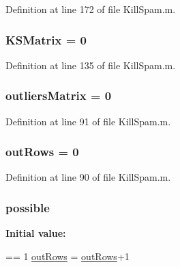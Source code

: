 Definition at line 172 of file Kill\-Spam.\-m.

\hypertarget{a00029_aea43faf8d3d68de03c645edc96b0c1c0}{
\subsubsection[{K\-S\-Matrix}]{\setlength{\rightskip}{0pt plus 5cm}K\-S\-Matrix = 0}}\label{a00029_aea43faf8d3d68de03c645edc96b0c1c0}


Definition at line 135 of file Kill\-Spam.\-m.

\hypertarget{a00029_ad8a18b407726bf44299c9bcf5d1389ff}{
\subsubsection[{outliers\-Matrix}]{\setlength{\rightskip}{0pt plus 5cm}outliers\-Matrix = 0}}\label{a00029_ad8a18b407726bf44299c9bcf5d1389ff}


Definition at line 91 of file Kill\-Spam.\-m.

\hypertarget{a00029_a60cfb1ca20cbbc81b85a8f56658b7c99}{
\subsubsection[{out\-Rows}]{\setlength{\rightskip}{0pt plus 5cm}out\-Rows = 0}}\label{a00029_a60cfb1ca20cbbc81b85a8f56658b7c99}


Definition at line 90 of file Kill\-Spam.\-m.

\hypertarget{a00029_a07c9e68cdbafe572c04d3112d64deb88}{
\subsubsection[{possible}]{ possible}}\label{a00029_a07c9e68cdbafe572c04d3112d64deb88}
{\bfseries Initial value\-:}
\begin{DoxyCode}
== 1
            \hyperlink{a00029_a60cfb1ca20cbbc81b85a8f56658b7c99}{outRows} = \hyperlink{a00029_a60cfb1ca20cbbc81b85a8f56658b7c99}{outRows}+1
\end{DoxyCode}


